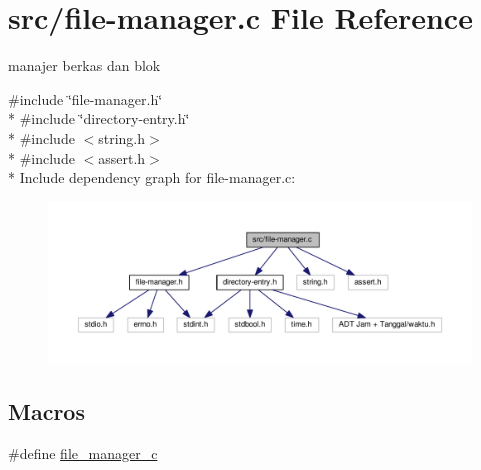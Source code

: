 \hypertarget{file-manager_8c}{\section{src/file-\/manager.c File Reference}
\label{file-manager_8c}
}


manajer berkas dan blok  


{\ttfamily \#include \char`\"{}file-\/manager.\-h\char`\"{}}\\*
{\ttfamily \#include \char`\"{}directory-\/entry.\-h\char`\"{}}\\*
{\ttfamily \#include $<$string.\-h$>$}\\*
{\ttfamily \#include $<$assert.\-h$>$}\\*
Include dependency graph for file-\/manager.c\-:\nopagebreak
\begin{figure}[H]
\begin{center}
\leavevmode
\includegraphics[width=350pt]{file-manager_8c__incl}
\end{center}
\end{figure}
\subsection*{Macros}
\begin{DoxyCompactItemize}
\item 
\#define \hyperlink{file-manager_8c_a4cf8a8494b61cb9b9cbadc130d35f662}{file\-\_\-manager\-\_\-c}
\end{DoxyCompactItemize}
